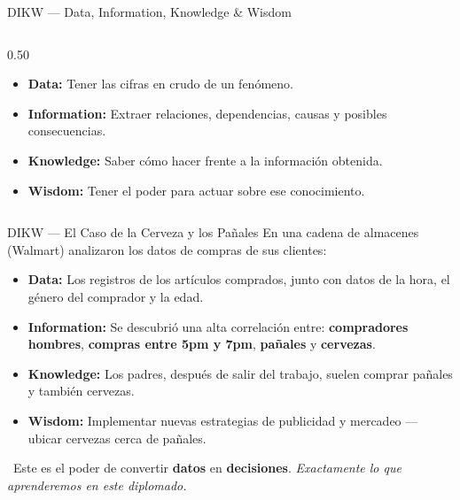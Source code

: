\documentclass[aspectratio=169, 11pt]{beamer}
\begin{document}
\begin{frame}{DIKW --- Data, Information, Knowledge \& Wisdom}
\begin{columns}[c]
    \begin{column}{0.50\textwidth}
      {\scriptsize
      \begin{itemize}\setlength{\itemsep}{5pt}
        \item[{\color{dikwData}\scriptsize\faDatabase}]
          \textbf{Data:} Tener las cifras en crudo de un fenómeno.
        \item[{\color{dikwInfo}\scriptsize\faInfoCircle}]
          \textbf{Information:} Extraer relaciones, dependencias,
          causas y posibles consecuencias.
        \item[{\color{dikwKnow}\scriptsize\faBrain}]
          \textbf{Knowledge:} Saber cómo hacer frente a la
          información obtenida.
        \item[{\color{dikwWis}\scriptsize\faStar}]
          \textbf{Wisdom:} Tener el poder para actuar sobre
          ese conocimiento.
      \end{itemize}
      }
    \end{column}
  \end{columns}
\end{frame}

\begin{frame}{DIKW --- El Caso de la Cerveza y los Pañales}
  \vspace{-4pt}
  {\footnotesize\color{arcaDark}
    En una cadena de almacenes (Walmart) analizaron los datos de compras
    de sus clientes:}

  \vspace{6pt}
  {\scriptsize
  \begin{itemize}\setlength{\itemsep}{5pt}
    \item[{\color{dikwData}\faDatabase}]
      \textbf{Data:} Los registros de los artículos comprados,
      junto con datos de la hora, el género del comprador y la edad.
    \item[{\color{dikwInfo}\faInfoCircle}]
      \textbf{Information:} Se descubrió una alta correlación entre:
      {\color{codeBlue}\bfseries compradores hombres},
      {\color{beerYellow}\bfseries compras entre 5pm y 7pm},
      {\color{beerPink}\bfseries pañales} y
      {\color{codeOrange}\bfseries cervezas}.
    \item[{\color{dikwKnow}\faBrain}]
      \textbf{Knowledge:} Los padres, después de salir del trabajo,
      suelen comprar pañales y también cervezas.
    \item[{\color{dikwWis}\faStar}]
      \textbf{Wisdom:} Implementar nuevas estrategias de
      publicidad y mercadeo --- ubicar cervezas cerca de pañales.
  \end{itemize}
  }

  \vspace{6pt}
  {\scriptsize\color{textMuted}
    \faLightbulb\ Este es el poder de convertir \textbf{datos} en
    \textbf{decisiones}.
    \textit{Exactamente lo que aprenderemos en este diplomado.}}
\end{frame}
\end{document}
